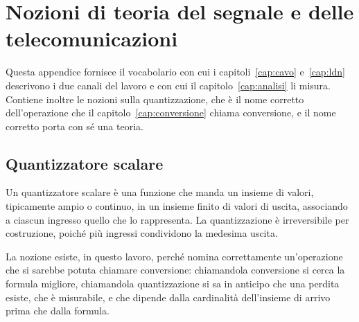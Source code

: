 
\chapter{Nozioni di teoria del segnale e delle telecomunicazioni}
\label{app:segnale}

Questa appendice fornisce il vocabolario con cui i capitoli~\ref{cap:cavo} e~\ref{cap:ldn} descrivono i due canali del lavoro e con cui il capitolo~\ref{cap:analisi} li misura. Contiene inoltre le nozioni sulla quantizzazione, che è il nome corretto dell'operazione che il capitolo~\ref{cap:conversione} chiama conversione, e il nome corretto porta con sé una teoria.

\section{Quantizzatore scalare}

Un quantizzatore scalare è una funzione che manda un insieme di valori, tipicamente ampio o continuo, in un insieme finito di valori di uscita, associando a ciascun ingresso quello che lo rappresenta. La quantizzazione è irreversibile per costruzione, poiché più ingressi condividono la medesima uscita.

La nozione esiste, in questo lavoro, perché nomina correttamente un'operazione che si sarebbe potuta chiamare conversione: chiamandola conversione si cerca la formula migliore, chiamandola quantizzazione si sa in anticipo che una perdita esiste, che è misurabile, e che dipende dalla cardinalità dell'insieme di arrivo prima che dalla formula.

